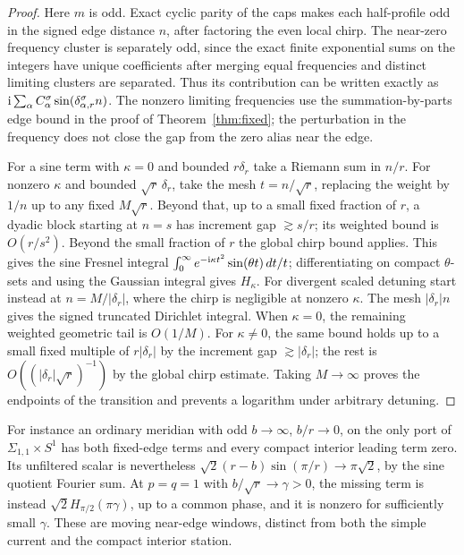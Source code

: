 \documentclass[11pt]{article}
\newcommand\ii{{\rm i}}
\begin{document}
\begin{proof}
Here \(m\) is odd. Exact cyclic parity of the caps makes each half-profile odd in the signed edge distance \(n\), after factoring the even local chirp. The near-zero frequency cluster is separately odd, since the exact finite exponential sums on the integers have unique coefficients after merging equal frequencies and distinct limiting clusters are separated. Thus its contribution can be written exactly as \(\ii\sum_\alpha C^\sigma_\alpha\sin(\delta^\sigma_{\alpha,r}n)\). The nonzero limiting frequencies use the summation-by-parts edge bound in the proof of Theorem~\ref{thm:fixed}; the perturbation in the frequency does not close the gap from the zero alias near the edge.

For a sine term with \(\kappa=0\) and bounded \(r\delta_r\) take a Riemann sum in \(n/r\). For nonzero \(\kappa\) and bounded \(\sqrt r\,\delta_r\), take the mesh \(t=n/\sqrt r\), replacing the weight by \(1/n\) up to any fixed \(M\sqrt r\). Beyond that, up to a small fixed fraction of \(r\), a dyadic block starting at \(n=s\) has increment gap \(\gtrsim s/r\); its weighted bound is \(O(r/s^2)\). Beyond the small fraction of \(r\) the global chirp bound applies. This gives the sine Fresnel integral \(\int_0^\infty e^{-\ii\kappa t^2}\sin(\theta t)\,dt/t\); differentiating on compact \(\theta\)-sets and using the Gaussian integral gives \(H_\kappa\). For divergent scaled detuning start instead at \(n=M/|\delta_r|\), where the chirp is negligible at nonzero \(\kappa\). The mesh \(|\delta_r|n\) gives the signed truncated Dirichlet integral. When \(\kappa=0\), the remaining weighted geometric tail is \(O(1/M)\). For \(\kappa\ne0\), the same bound holds up to a small fixed multiple of \(r|\delta_r|\) by the increment gap \(\gtrsim|\delta_r|\); the rest is \(O((|\delta_r|\sqrt r)^{-1})\) by the global chirp estimate. Taking \(M\to\infty\) proves the endpoints of the transition and prevents a logarithm under arbitrary detuning.
\end{proof}

For instance an ordinary meridian with odd \(b\to\infty\), \(b/r\to0\), on the only port of \(\Sigma_{1,1}\times S^1\) has both fixed-edge terms and every compact interior leading term zero. Its unfiltered scalar is nevertheless \(\sqrt2(r-b)\sin(\pi/r)\to\pi\sqrt2\), by the sine quotient Fourier sum. At \(p=q=1\) with \(b/\sqrt r\to\gamma>0\), the missing term is instead \(\sqrt2 H_{\pi/2}(\pi\gamma)\), up to a common phase, and it is nonzero for sufficiently small \(\gamma\). These are moving near-edge windows, distinct from both the simple current and the compact interior station.
\end{document}
